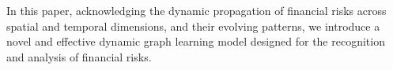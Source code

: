 In this paper, acknowledging the dynamic propagation of financial risks across spatial and temporal dimensions, and their evolving patterns, we introduce a novel and effective dynamic graph learning model designed for the recognition and analysis of financial risks.


% 




